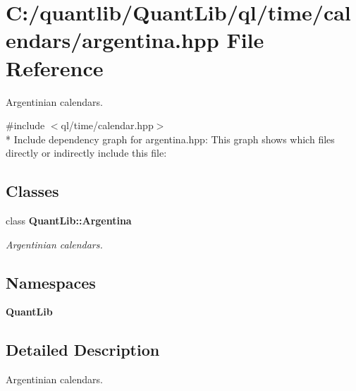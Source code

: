 \section{C\+:/quantlib/\+Quant\+Lib/ql/time/calendars/argentina.hpp File Reference}
\label{argentina_8hpp}


Argentinian calendars.  


{\ttfamily \#include $<$ql/time/calendar.\+hpp$>$}\\*
Include dependency graph for argentina.\+hpp\+:
This graph shows which files directly or indirectly include this file\+:
\subsection*{Classes}
\begin{DoxyCompactItemize}
\item 
class {\bf Quant\+Lib\+::\+Argentina}
\begin{DoxyCompactList}\small\item\em Argentinian calendars. \end{DoxyCompactList}\end{DoxyCompactItemize}
\subsection*{Namespaces}
\begin{DoxyCompactItemize}
\item 
 {\bf Quant\+Lib}
\end{DoxyCompactItemize}


\subsection{Detailed Description}
Argentinian calendars. 

